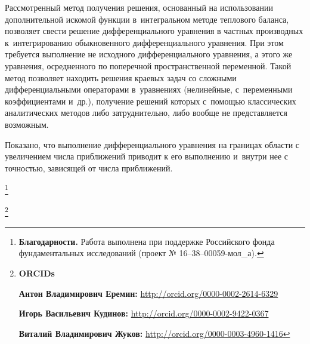  Рассмотренный метод получения решения, основанный на использовании дополнительной искомой функции в~интегральном методе теплового баланса, позволяет свести решение дифференциального уравнения в частных производных к~интегрированию обыкновенного дифференциального уравнения. При этом требуется выполнение не исходного дифференциального уравнения, а этого же уравнения, осредненного по поперечной пространственной переменной. Такой метод позволяет находить решения краевых задач со сложными дифференциальными операторами в~уравнениях (нелинейные, с~переменными коэффициентами и~др.), получение решений которых с~помощью классических аналитических методов либо затруднительно, либо вообще не представляется возможным.



Показано, что выполнение дифференциального уравнения на границах области с увеличением числа приближений приводит к его выполнению и~внутри нее с точностью, зависящей от числа приближений.







\thanks{{\bf Благодарности.} Работа выполнена при поддержке Российского фонда фундаментальных исследований (проект № 16--38--00059-мол\_а).}










%




\thanks{{\bf ORCIDs}



{\bf Антон Владимирович Еремин:} \url{http://orcid.org/0000-0002-2614-6329}



{\bf Игорь Васильевич Кудинов:} \url{http://orcid.org/0000-0002-9422-0367}



{\bf Виталий Владимирович Жуков:} \url{http://orcid.org/0000-0003-4960-1416}



}



\RusRef




